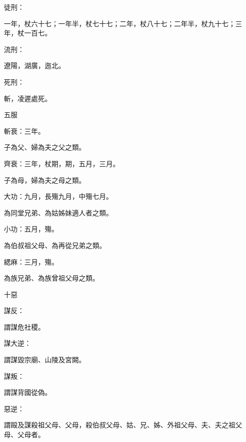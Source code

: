 \begin{pinyinscope}
 徒刑：



 一年，杖六十七；一年半，杖七十七；二年，杖八十七；二年半，杖九十七；三年，杖一百七。



 流刑：



 遼陽，湖廣，迤北。



 死刑：



 斬，凌遲處死。



 五服



 斬衰：三年。



 子為父、婦為夫之父之類。



 齊衰：三年，杖期，期，五月，三月。



 子為母，婦為夫之母之類。



 大功：九月，長殤九月，中殤七月。



 為同堂兄弟、為姑姊妹適人者之類。



 小功：五月，殤。



 為伯叔祖父母、為再從兄弟之類。



 緦麻：三月，殤。



 為族兄弟、為族曾祖父母之類。



 十惡



 謀反：



 謂謀危社稷。



 謀大逆：



 謂謀毀宗廟、山陵及宮闕。



 謀叛：



 謂謀背國從偽。



 惡逆：



 謂毆及謀殺祖父母、父母，殺伯叔父母、姑、兄、姊、外祖父母、夫、夫之祖父母、父母者。




\end{pinyinscope}
